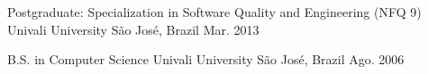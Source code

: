 

\begin{cventries}

  \cventry
    {Postgraduate: Specialization in Software Quality and Engineering (NFQ 9)} %
    {Univali University} %
    {São José, Brazil} %
    {Mar. 2013} %
    {}

  \cventry
    {B.S. in Computer Science} %
    {Univali University} %
    {São José, Brazil} %
    {Ago. 2006} %
    {}

\end{cventries}
